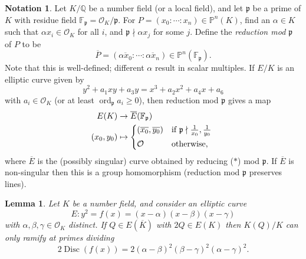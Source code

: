 \documentclass[a4paper]{article}
\newtheorem{lemma}[theorem]{Lemma}
\theoremstyle{definition}
\newtheorem*{notation}{Notation}
\DeclareMathOperator{\Disc}{Disc}
\DeclareMathOperator{\ord}{ord}
\newcommand{\p}{\mathfrak{p}}
\renewcommand{\P}{\mathbb{P}}
\renewcommand{\O}{\mathcal{O}}
\newcommand{\F}{\mathbb{F}}
\newcommand{\Q}{\mathbb{Q}}
\begin{document}
\begin{notation}
    Let $K/\Q$ be a number field (or a local field), and let $\p$ be a prime of
    $K$ with residue field $\F_\p=\O_K/\p$. For $P=(x_0:\cdots:x_n)\in\P^n(K)$,
    find an $\alpha\in K$ such that $\alpha x_i\in\O_K$ for all $i$, and
    $\p\nmid\alpha x_j$ for some $j$. Define the \emph{reduction mod $\p$} of
    $P$ to be
    \begin{equation*}
        \overline P = (\overline{\alpha x_0}:\cdots:\overline{\alpha x_n})
            \in\P^n(\F_\p).
    \end{equation*}
    Note that this is well-defined; different $\alpha$ result in scalar
    multiples. If $E/K$ is an elliptic curve given by
    \begin{equation*}
        y^2 + a_1xy + a_3y = x^3 + a_2x^2 + a_4x + a_6 \tag{$*$}
    \end{equation*}
    with $a_i\in\O_K$ (or at least $\ord_\p a_i\ge0$), then reduction mod $\p$
    gives a map
    \begin{align*}
        E(K) &\to \overline E(\F_\p) \\
        (x_0,y_0) &\mapsto \begin{dcases*}
            (\overline{x_0},\overline{y_0})
                & if $\p\nmid\frac{1}{x_0},\frac{1}{y_0}$ \\
            \O & otherwise,
        \end{dcases*}
    \end{align*}
    where $\overline E$ is the (possibly singular) curve obtained by reducing
    ($*$) mod $\p$. If $\overline E$ is non-singular then this is a group
    homomorphism (reduction mod $\p$ preserves lines).
\end{notation}

\begin{lemma}
    Let $K$ be a number field, and consider an elliptic curve
    \begin{equation*}
        E:y^2 = f(x) = (x-\alpha)(x-\beta)(x-\gamma)
    \end{equation*}
    with $\alpha,\beta,\gamma\in\O_K$ distinct. If $Q\in E(\overline K)$ with
    $2Q\in E(K)$ then $K(Q)/K$ can only ramify at primes dividing
    \begin{equation*}
        2\Disc(f(x)) = 2(\alpha-\beta)^2(\beta-\gamma)^2(\alpha-\gamma)^2.
    \end{equation*}
\end{lemma}
\end{document}
